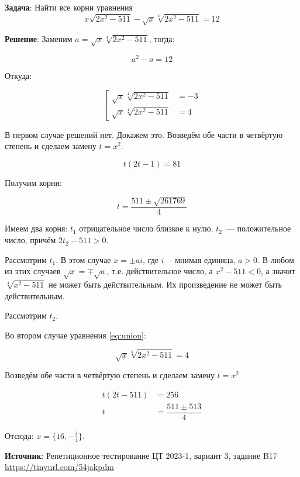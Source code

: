 \documentclass{article} %
\begin{document}
\textbf{Задача}: Найти все корни уравнения
\begin{equation}
  x \sqrt{2x^2 - 511} - \sqrt{x} \sqrt[4]{2x^2 - 511} = 12
\end{equation}

\textbf{Решение}: Заменим $a = \sqrt{x} \sqrt[4]{2x^2 - 511}$, тогда:

\begin{equation}
  a^2 - a = 12
\end{equation}

Откуда:

\begin{equation}
  \left[
    \begin{aligned}
      \sqrt{x} \sqrt[4]{2x^2 - 511} & = -3 \\
      \sqrt{x} \sqrt[4]{2x^2 - 511} & = 4
    \end{aligned}
  \right.
  \label{eq:union}
\end{equation}

В первом случае решений нет. Докажем это. Возведём обе части в четвёртую степень и сделаем замену $t = x^2$.

\begin{equation}
  t (2t - 1) = 81
\end{equation}

Получим корни:

\begin{equation}
  t = \dfrac{511 \pm \sqrt{261769}}{4}
\end{equation}

Имеем два корня: $t_1$ отрицательное число близкое к нулю, $t_2$~--- положительное число, причём $2t_2 - 511 > 0$.

Рассмотрим $t_1$. В этом случае $x = \pm ai$, где $i$~-- мнимая единица, $a>0$. В любом из этих случаев $\sqrt{x} = \mp \sqrt{a}$, т.е. действительное число, а $x^2 - 511 < 0$, а значит $\sqrt[4]{x^2 - 511}$ не может быть действительным. Их произведение не может быть действительным.

Рассмотрим $t_2$. 

Во втором случае уравнения \ref{eq:union}:

\begin{equation}
  \sqrt{x} \sqrt[4]{2x^2 - 511} = 4
\end{equation}

Возведём обе части в четвёртую степень и сделаем замену $t = x^2$

\begin{equation}
\begin{aligned}
  t (2t - 511) & = 256 \\
  t & = \dfrac{511 \pm 513}{4} 
\end{aligned}
\end{equation}

Отсюда: $x = \{16, -\frac{i}{4}\}$.

\textbf{Источник}: Репетиционное тестирование ЦТ 2023-1, вариант 3, задание B17 \url{https://tinyurl.com/54jakpdm} 
\end{document}
